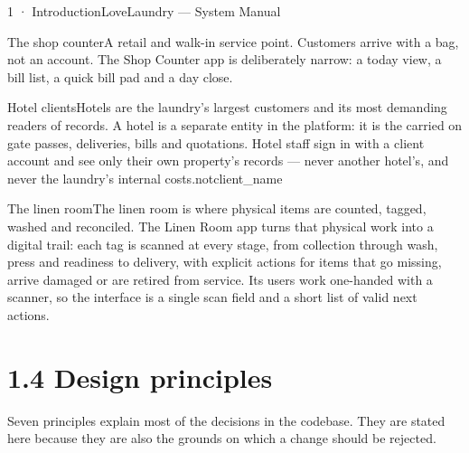 \documentclass[11pt,a4paper,oneside]{book}
\begin{document}
1 · IntroductionLoveLaundry — System Manual

The shop counterA retail and walk-in service point. Customers arrive with a bag, not an account. The Shop Counter app is deliberately narrow: a today view, a bill list, a quick bill pad and a day close.

Hotel clientsHotels are the laundry's largest customers and its most demanding readers of records. A hotel is a separate entity in the platform: it is the carried on gate passes, deliveries, bills and quotations. Hotel staff sign in with a client account and see only their own property's records — never another hotel's, and never the laundry's internal costs.notclient\_name

The linen roomThe linen room is where physical items are counted, tagged, washed and reconciled. The Linen Room app turns that physical work into a digital trail: each tag is scanned at every stage, from collection through wash, press and readiness to delivery, with explicit actions for items that go missing, arrive damaged or are retired from service. Its users work one-handed with a scanner, so the interface is a single scan field and a short list of valid next actions.

\section{1.4 Design principles}
Seven principles explain most of the decisions in the codebase. They are stated here because they are also the grounds on which a change should be rejected.
\end{document}
